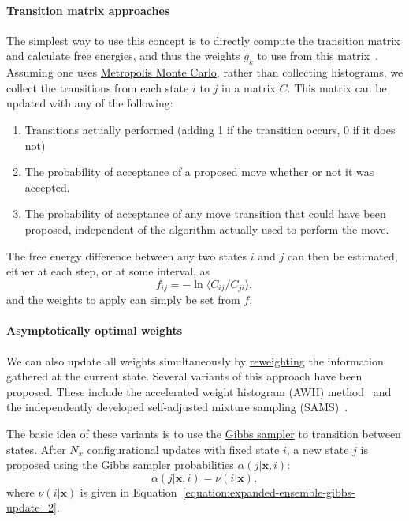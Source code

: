 \documentclass[9pt,review]{livecoms}
\newcommand{\vx}{\mathbf{x}}
\begin{document}
\paragraph{Transition matrix approaches}
The simplest way to use this concept is to directly compute the transition matrix and calculate free energies, and thus the weights $g_k$ to use from this matrix~\cite{siderius_2013}. Assuming one uses \hyperlink{ref:MetropolisMonteCarlo} {Metropolis Monte Carlo}, rather than collecting histograms, we collect the transitions from each state $i$ to $j$ in a matrix $C$. This matrix can be updated with any of the following:
\begin{enumerate}
\item Transitions actually performed (adding 1 if the transition occurs, 0 if it does not)\label{item:actual}
\item The probability of acceptance of a proposed move whether or not it was accepted.\label{item:proposal}
\item The probability of acceptance of any move transition that could have been proposed, independent of the algorithm actually used to perform the move. \label{item:transition}
\end{enumerate}

The free energy difference between any two states $i$ and $j$ can then be estimated, either at each step, or at some interval, as
\begin{equation}
f_{ij} = - \ln \langle C_{ij}/C_{ji} \rangle,
\label{eq:transitionmc}
\end{equation}
and the weights to apply can simply be set from $f$.

\paragraph{Asymptotically optimal weights}
We can also update all weights simultaneously by \hyperlink{ref:Reweighting} {reweighting} the information gathered at the current state. Several variants of this approach have been proposed. These include the accelerated weight histogram (AWH) method~\cite{Lidmar2012} and the independently developed self-adjusted mixture sampling (SAMS)~\cite{tan_optimally_2017}.

The basic idea of these variants is to use the \hyperlink{ref:GibbsSampler} {Gibbs sampler} to transition between states. After $N_x$ configurational updates with fixed state $i$, a new state $j$ is proposed using the \hyperlink{ref:GibbsSampler} {Gibbs sampler} probabilities $\alpha(j|\vx, i)$:
\begin{equation}\label{eq:gibbsproposal}
  \alpha(j|\vx, i) = \nu(i|\vx),
\end{equation}
where $\nu(i|\vx)$ is given in Equation~\ref{equation:expanded-ensemble-gibbs-update_2}.
\end{document}
